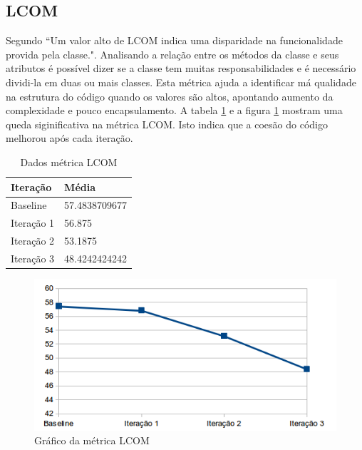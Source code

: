\subsection{LCOM}

Segundo  ``Um valor alto de LCOM indica uma disparidade na
funcionalidade provida pela classe.". Analisando a relação entre os métodos da
classe e seus atributos é possível dizer se a classe tem muitas
responsabilidades e é necessário dividi-la em duas ou mais classes. Esta métrica
ajuda a identificar má qualidade na estrutura do código quando os valores são
altos, apontando aumento da complexidade e pouco encapsulamento. A tabela
\ref{tab:lcom} e a figura \ref{fig:lcom} mostram uma queda siginificativa na
métrica LCOM. Isto indica que a coesão do código melhorou após cada iteração.

\begin{table}[!h]
	\centering
	    \caption{Dados métrica LCOM}
    \begin{tabular}{ | l | l | }
    \hline
    Iteração & Média 			\\ \hline
    Baseline & 57.4838709677   	\\ \hline
    Iteração 1 & 56.875			\\ \hline
	Iteração 2 & 53.1875		\\ \hline
	Iteração 3 & 48.4242424242	\\ \hline
    \end{tabular}
    \label{tab:lcom}
\end{table}

\begin{figure}[!htb]
	\label{fig:lcom}
	\caption{Gráfico da métrica LCOM}   
	\begin{center}
		\includegraphics{img/lcom.png}
	\end{center}
\end{figure}
